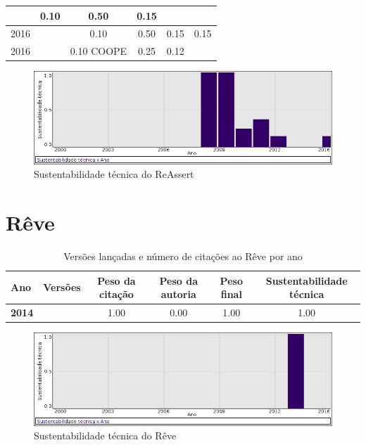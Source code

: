 \begin{table}[H]
\begin{tabular}{| l | c | c | c | c | c |}
          &
          0.10
          &
          0.50
          &
          0.15
          &
          \\
\hline
            2016
          &
          
          &
          0.10
          &
          0.50
          &
          0.15
          &
            {\color{red} 0.15}
          \\
            2016
          &
          
          &
          0.10
            {\tiny COOPE}
          &
          0.25
          &
          0.12
          &
          \\
\hline
\end{tabular}
\end{table}

\begin{figure}[h]
  \center
  \includegraphics[scale=0.50]{imagens/softwares-charts/reassert.png}
  \caption{Sustentabilidade técnica do ReAssert}
\end{figure}


\section{Rêve}


\begin{table}[H]
\caption{Versões lançadas e número de citações ao Rêve por ano}
\centering
\begin{tabular}{| l | c | c | c | c | c |}
  \hline
  Ano & Versões & Peso da citação & Peso da autoria & Peso final & Sustentabilidade técnica \\
  \hline
            {\bf 2014}
          &
          
          &
          1.00
          &
          0.00
          &
          1.00
          &
            {\color{blue} 1.00}
          \\
\hline
\end{tabular}
\end{table}

\begin{figure}[h]
  \center
  \includegraphics[scale=0.50]{imagens/softwares-charts/reve.png}
  \caption{Sustentabilidade técnica do Rêve}
\end{figure}


